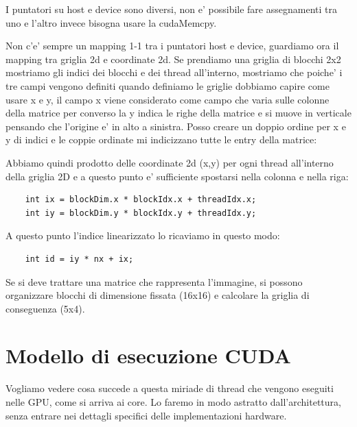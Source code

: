 I puntatori su host e device sono diversi, non e' possibile fare assegnamenti tra uno e l'altro invece bisogna usare la cudaMemcpy.

Non c'e' sempre un mapping 1-1 tra i puntatori host e device, guardiamo ora il mapping tra griglia 2d e coordinate 2d.
Se prendiamo una griglia di blocchi 2x2 mostriamo gli indici dei blocchi e dei thread all'interno, mostriamo che poiche' i tre campi vengono definiti quando definiamo le griglie dobbiamo capire come usare x e y, il campo x viene considerato come campo che varia sulle colonne della matrice per converso la y indica le righe della matrice e si muove in verticale pensando che l'origine e' in alto a sinistra. Posso creare un doppio ordine per x e y di indici e le coppie ordinate mi indicizzano tutte le entry della matrice:

Abbiamo quindi prodotto delle coordinate 2d (x,y) per ogni thread all'interno della griglia 2D e a questo punto e' sufficiente spostarsi nella colonna e nella riga:
\begin{lstlisting}
    int ix = blockDim.x * blockIdx.x + threadIdx.x;
    int iy = blockDim.y * blockIdx.y + threadIdx.y;
\end{lstlisting}
A questo punto l'indice linearizzato lo ricaviamo in questo modo:
\begin{lstlisting}
    int id = iy * nx + ix;
\end{lstlisting}


Se si deve trattare una matrice che rappresenta l'immagine, si possono organizzare blocchi di dimensione fissata (16x16) e calcolare la griglia di conseguenza (5x4).

\section{Modello di esecuzione CUDA}
Vogliamo vedere cosa succede a questa miriade di thread che vengono eseguiti nelle GPU, come si arriva ai core. Lo faremo in modo astratto dall'architettura, senza entrare nei dettagli specifici delle implementazioni hardware.

